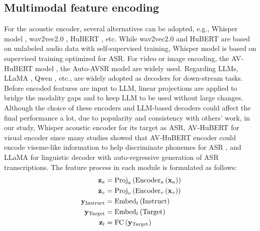 \documentclass[conference]{IEEEtran}
\begin{document}
\subsection{Multimodal feature encoding}
For the acoustic encoder, several alternatives can be adopted, e.g., Whisper model \cite{Whisper2023}, wav2vec2.0 \cite{Wav2Vec2.0}, HuBERT \cite{HuBERT}, etc. While wav2vec2.0 and HuBERT are based on unlabeled audio data with self-supervised training, Whisper model is based on supervised training optimized for ASR. For video or image encoding, the AV-HuBERT model \cite{AVHUBERT}, the Auto-AVSR model \cite{MaICASSP2023} are widely used. Regarding LLMs, LLaMA \cite{LLaMA3.2}, Qwen \cite{Qwen}, etc., are widely adopted as decoders for down-stream tasks. Before encoded features are input to LLM, linear projections are applied to bridge the modality gaps and to keep LLM to be used without large changes. Although the choice of these encoders and LLM-based decoders could affect the final performance a lot, due to popularity and consistency with others' work, in our study, Whisper acoustic encoder for its target as ASR, AV-HuBERT for visual encoder since many studies showed that AV-HuBERT encoder could encode viseme-like information to help discriminate phonemes for ASR \cite{AVHUBERT}, and LLaMA for linguistic decoder with auto-regressive generation of ASR transcriptions. The feature process in each module is formulated as follows:
\begin{equation}
	\begin{array}{l}
		\begin{aligned}
			{\bf z}_a  &= {\rm Proj}_a \left( {{\rm Encoder}_a \left( {{\bf x}_a} \right)} \right) \\ 
			{\bf z}_v  &= {\rm Proj}_v \left( {{\rm Encoder}_v \left( {{\bf x}}_v \right)} \right) \\ 
			{\bf y}_{{\rm Instruct}}  &= {\rm Embed}_t \left( {{\rm Instruct}} \right) \\ 
			{\bf y}_{{\rm Target}}  &= {\rm Embed}_t \left( {{\rm Target}} \right) \\ 
			{\bf z}_t  &= {\rm FC}\left( {{\bf y}_{{\rm Target}} } \right) \\ 
		\end{aligned}
	\end{array}
\end{equation}
\end{document}
